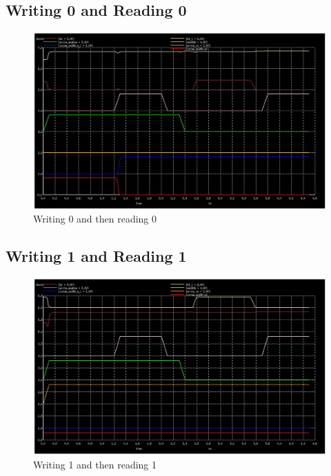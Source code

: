 \documentclass[12pt]{report}
\begin{document}
\subsection*{Writing 0 and Reading 0}
\begin{figure}[H]
  \centering
    \includegraphics[width=1.0\textwidth]{write_0_then_read_0.png}
  \caption{Writing 0 and then reading 0}
  \label{fig:write_0_then_read_0}
\end{figure}

\subsection*{Writing 1 and Reading 1}
\begin{figure}[H]
  \centering
    \includegraphics[width=1.0\textwidth]{write_1_then_read_1.png}
  \caption{Writing 1 and then reading 1}
  \label{fig:write_1_then_read_1}
\end{figure}
\end{document}
